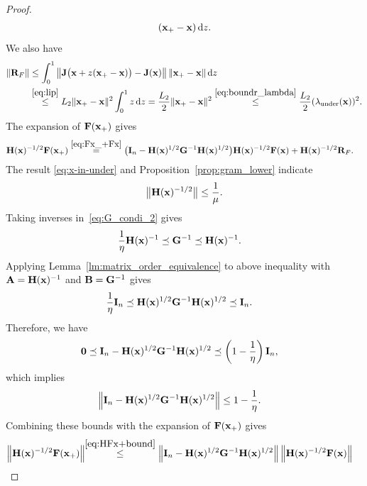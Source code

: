 \documentclass[11pt]{article}
\theoremstyle{plain}
\theoremstyle{definition}
\theoremstyle{remark}
\theoremstyle{plain}
\newcommand{\Norm}[1]{\left\| #1 \right\|}
\newcommand{\R}{\mathbb{R}}
\def\A{{\bf A}}
\def\B{{\bf B}}
\def\F{{\bf F}}
\def\G{{\bf G}}
\def\H{{\bf H}}
\def\I{{\bf I}}
\def \J{{\bf J}}
\def\R{{\bf R}}
\def\x{{\bf x}}
\def\0{{\bf 0}}
\begin{document}
\begin{proof}
\begin{align*}
(\x_{+}-\x)\,{\rm d}z.    
\end{align*}
We also have
\begin{align}
\label{eq:R_Fnormbound}
\begin{split}
\|\R_F\|
&\leq\int_0^1
\Norm{\J\bigl(\x+z(\x_{+}-\x)\bigr)-\J(\x)}
\|\x_{+}-\x\|\,{\rm d}z\\
&\overset{\eqref{eq:lip}}{\leq}
L_2\|\x_{+}-\x\|^2\int_0^1z\,{\rm d}z
=\frac{L_2}{2}\|\x_{+}-\x\|^2
\overset{\eqref{eq:boundr_lambda}}{\leq}
\frac{L_2}{2}(\lambda_{\mathrm{under}}(\x))^2.
\end{split}
\end{align}
The expansion of $\F(\x_{+})$ gives
\begin{align}
\label{eq:HFx+bound}
\H(\x)^{-1/2}\F(\x_{+})
&\overset{\eqref{eq:Fx_+Fx}}{=}\bigl(\I_n-\H(\x)^{1/2}\G^{-1}\H(\x)^{1/2}\bigr)
\H(\x)^{-1/2}\F(\x)+\H(\x)^{-1/2}\R_F.
\end{align}
The result \eqref{eq:x-in-under}  and Proposition~\ref{prop:gram_lower} indicate
\begin{align}\label{eq:H12mu}
\big\|\H(\x)^{-1/2}\big\|\leq\frac{1}{\mu}.    
\end{align}
Taking inverses in~\eqref{eq:G_condi_2} gives
\begin{align*}
\frac{1}{\eta}\H(\x)^{-1}
&\preceq\G^{-1}\preceq\H(\x)^{-1}.
\end{align*}
Applying Lemma~\ref{lm:matrix_order_equivalence} to above inequality with
$\A=\H(\x)^{-1}$ and $\B=\G^{-1}$ gives
\begin{align*}
\frac{1}{\eta}\I_n
&\preceq\H(\x)^{1/2}\G^{-1}\H(\x)^{1/2}\preceq\I_n.
\end{align*}
Therefore, we have
\begin{align*}
\0
&\preceq\I_n-\H(\x)^{1/2}\G^{-1}\H(\x)^{1/2}
\preceq\left(1-\frac{1}{\eta}\right)\I_n,
\end{align*}
which implies
\begin{align}
\label{eq:normI-HGH}
\Norm{\I_n-\H(\x)^{1/2}\G^{-1}\H(\x)^{1/2}}
&\leq1-\frac{1}{\eta}.
\end{align}
Combining these bounds with the expansion of $\F(\x_{+})$ gives
\begin{align}
\label{eq:HFx+}
\Norm{\H(\x)^{-1/2}\F(\x_{+})}
&\!\!\overset{\eqref{eq:HFx+bound}}{\leq}\Norm{\I_n-\H(\x)^{1/2}\G^{-1}\H(\x)^{1/2}}
\Norm{\H(\x)^{-1/2}\F(\x)}

\end{align}
\end{proof}
\end{document}
